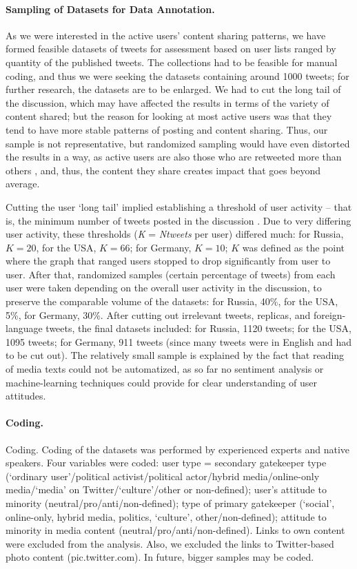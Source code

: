 \paragraph{Sampling of Datasets for Data Annotation.} As we were interested in the active users’ content sharing patterns, we have formed feasible datasets of tweets for assessment based on user lists ranged by quantity of the published tweets. The collections had to be feasible for manual coding, and thus we were seeking the datasets containing around 1000 tweets; for further research, the datasets are to be enlarged. We had to cut the long tail of the discussion, which may have affected the results in terms of the variety of content shared; but the reason for looking at most active users was that they tend to have more stable patterns of posting and content sharing. Thus, our sample is not representative, but randomized sampling would have even distorted the results in a way, as active users are also those who are retweeted more than others \cite{BodrunovaBlekanovMaksimov}, and, thus, the content they share creates impact that goes beyond average.

Cutting the user ‘long tail’ implied establishing a threshold of user activity -- that is, the minimum number of tweets posted in the discussion \cite{Chadwick,MunsonResnick}. Due to very differing user activity, these thresholds (\textit{K} = \textit{Ntweets} per user) differed much: for Russia, \(K = 20\), for the USA, \(K = 66\); for Germany, \(K = 10\); \(K\) was defined as the point where the graph that ranged users stopped to drop significantly from user to user. After that, randomized samples (certain percentage of tweets) from each user were taken depending on the overall user activity in the discussion, to preserve the comparable volume of the datasets: for Russia, 40\%, for the USA, 5\%, for Germany, 30\%. After cutting out irrelevant tweets, replicas, and foreign-language tweets, the final datasets included: for Russia, 1120 tweets; for the USA, 1095 tweets; for Germany, 911 tweets (since many tweets were in English and had to be cut out). The relatively small sample is explained by the fact that reading of media texts could not be automatized, as so far no sentiment analysis or machine-learning techniques could provide for clear understanding of user attitudes.

\paragraph{Coding.} 
Coding. Coding of the datasets was performed by experienced experts and native speakers. Four variables were coded: user type = secondary gatekeeper type (‘ordinary user’/political activist/political actor/hybrid media/online-only media/‘media’ on Twitter/‘culture’/other or non-defined); user’s attitude to minority (neutral/pro/anti/non-defined); type of primary gatekeeper (‘social’, online-only, hybrid media, politics, ‘culture’, other/non-defined); attitude to minority in media content (neutral/pro/anti/non-defined). Links to own content were excluded from the analysis. Also, we excluded the links to Twitter-based photo content (pic.twitter.com). In future, bigger samples may be coded.

